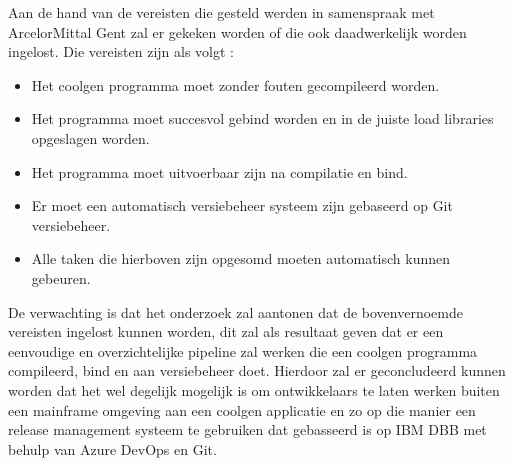 Aan de hand van de vereisten die gesteld werden in samenspraak met ArcelorMittal Gent zal er gekeken worden of die ook daadwerkelijk worden ingelost.
Die vereisten zijn als volgt :
\begin{itemize}
  \item Het coolgen programma moet zonder fouten gecompileerd worden.
  \item Het programma moet succesvol gebind worden en in de juiste load libraries opgeslagen worden.
  \item Het programma moet uitvoerbaar zijn na compilatie en bind.
  \item Er moet een automatisch versiebeheer systeem zijn gebaseerd op Git versiebeheer.
  \item Alle taken die hierboven zijn opgesomd moeten automatisch kunnen gebeuren.
\end{itemize}

De verwachting is dat het onderzoek zal aantonen dat de bovenvernoemde vereisten ingelost kunnen worden, dit zal als resultaat geven dat er een eenvoudige en overzichtelijke pipeline zal
werken die een coolgen programma compileerd, bind en aan versiebeheer doet.
Hierdoor zal er geconcludeerd kunnen worden dat het wel degelijk mogelijk is om ontwikkelaars te laten werken buiten een mainframe omgeving aan een coolgen applicatie en zo op die manier een
release management systeem te gebruiken dat gebasseerd is op IBM DBB met behulp van Azure DevOps en Git.